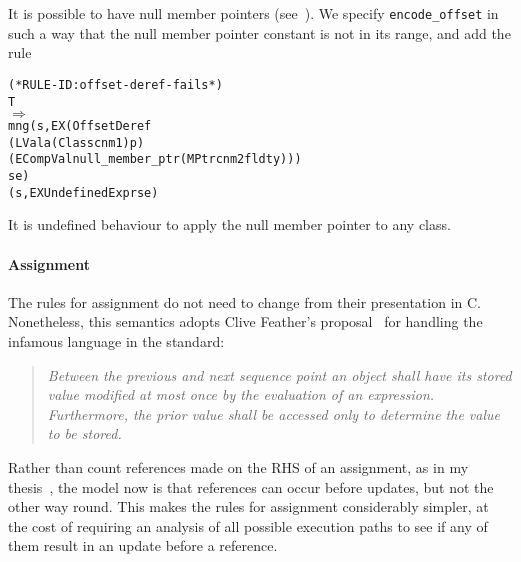 \documentclass[11pt]{article}
\begin{document}
It is possible to have null member pointers
(see~\cite[\S4.11]{cpp-standard-iso14882}).  We specify
\texttt{encode_offset} in such a way that the null member pointer
constant is not in its range, and add the rule
%
\begin{center}
\begin{minipage}{\textwidth}
\begin{alltt}
(* RULE-ID: offset-deref-fails *)
     T
   \(\Rightarrow\)
     mng (s, EX (OffsetDeref
                   (LVal a (Class cnm1) p)
                   (ECompVal null_member_ptr (MPtr cnm2 fldty)))
                se)
         (s, EX UndefinedExpr se)
\end{alltt}
\end{minipage}
\end{center}
It is undefined behaviour to apply the null member pointer to any
class.

\paragraph{Assignment}
\label{sec:assignment}
The rules for assignment do not need to change from their presentation
in C.  Nonetheless, this semantics adopts Clive
Feather's proposal~\cite{Feather2000} for
handling the infamous language in the standard:
\begin{quotation}
\itshape
    Between the previous and next sequence point an  object
    shall  have  its  stored  value modified at most once by the
    evaluation of an expression.  Furthermore, the  prior  value
    shall  be  accessed  only  to  determine  the  value  to  be
    stored.
\end{quotation}
Rather than count references made on the RHS of an assignment, as in
my thesis~\cite{Norrish98}, the model now is that references can occur
before updates, but not the other way round.  This makes the rules for
assignment considerably simpler, at the cost of requiring an analysis
of all possible execution paths to see if any of them result in an
update before a reference.
\end{document}
